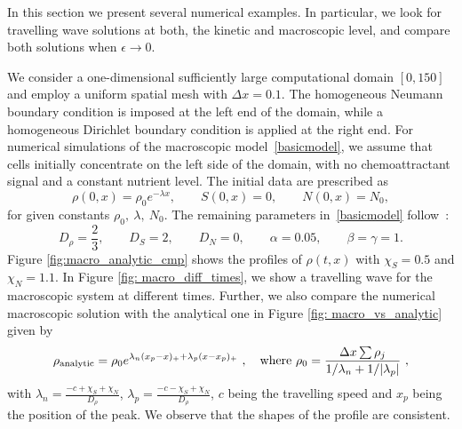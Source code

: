 \documentclass[11pt,twoside]{article}
\theoremstyle{nonumberplain}
\begin{document}
{%

In this section we present several numerical examples. In particular, we look for travelling wave solutions at both, the kinetic and macroscopic level, and compare both solutions when $\epsilon\to 0$.

We consider a one-dimensional sufficiently large computational domain $[0,150]$ and employ a uniform spatial mesh with $\Delta x = 0.1$.
The homogeneous Neumann boundary condition is imposed at the left end of the domain, while a homogeneous Dirichlet boundary condition is applied at the right end.
For numerical simulations of the macroscopic model~\eqref{basicmodel}, 
we assume that cells initially concentrate on the left side of the domain,
with no chemoattractant signal and a constant nutrient level.  
The initial data are prescribed as
\[
\rho(0,x) = \rho_0 e^{-\lambda x},\qquad 
S(0,x) = 0,\qquad 
N(0,x) = N_0,
\]
for given constants $\rho_0,\ \lambda,\ N_0$.  
The remaining parameters in~\eqref{basicmodel} follow~\cite{saragosti2010mathematical}:
\begin{equation}
D_\rho = \frac23,\qquad  
D_S = 2,\qquad 
D_N = 0,\qquad 
\alpha = 0.05,\qquad 
\beta = \gamma = 1.\label{eq: parameter values}
\end{equation}
Figure \ref{fig:macro_analytic_cmp} shows the profiles of $\rho(t,x)$ with $\chi_S = 0.5$ and $\chi_N = 1.1$. 
In Figure \ref{fig: macro_diff_times}, we show a travelling wave for the macroscopic system at different times. 
Further, we also compare the numerical macroscopic solution with the analytical one in Figure \ref{fig: macro_vs_analytic} given by
\begin{equation}
\rho_\text{analytic} = \rho_0 e^{\lambda_n(x_p - x)_+ + \lambda_p(x-x_p)_+}\ , \quad \textnormal{where}\ \rho_0 = \frac{\Delta x \sum \rho_j}{1/\lambda_n + 1 / |\lambda_p|}\ ,\label{eq: analytic sol}
\end{equation}
with $\lambda_n = \frac{-c +\chi_S + \chi_N}{D_\rho}$, $\lambda_p = \frac{-c -\chi_S + \chi_N}{D_\rho}$, 
$c$ being the travelling speed and $x_p$ being the position of the peak.
We observe that the shapes of the profile are consistent. 

}
\end{document}
